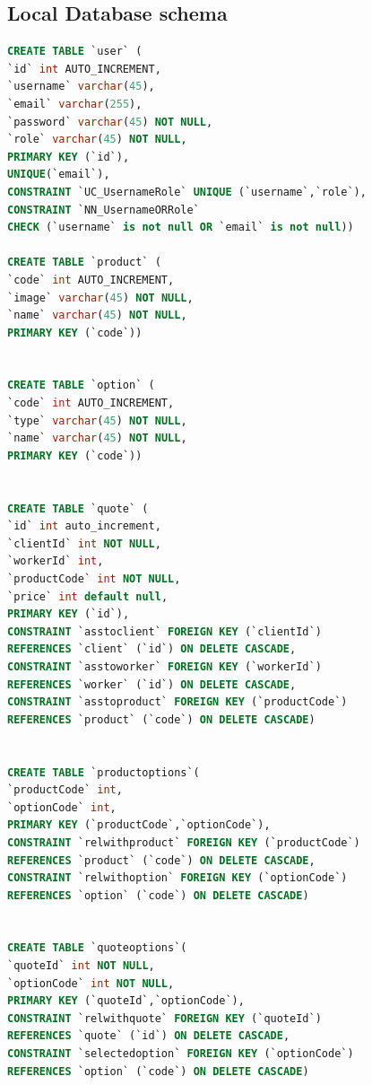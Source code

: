 \documentclass[a4paper, 12pt]{article}
\begin{document}
\subsection{Local Database schema}  \label{sub:localDatabaseSchema}
\begin{lstlisting}[language=SQL]
CREATE TABLE `user` (
`id` int AUTO_INCREMENT,
`username` varchar(45),
`email` varchar(255),
`password` varchar(45) NOT NULL,
`role` varchar(45) NOT NULL,
PRIMARY KEY (`id`),
UNIQUE(`email`),
CONSTRAINT `UC_UsernameRole` UNIQUE (`username`,`role`),
CONSTRAINT `NN_UsernameORRole` 
CHECK (`username` is not null OR `email` is not null))

CREATE TABLE `product` (
`code` int AUTO_INCREMENT,
`image` varchar(45) NOT NULL,
`name` varchar(45) NOT NULL,
PRIMARY KEY (`code`))


CREATE TABLE `option` (
`code` int AUTO_INCREMENT,
`type` varchar(45) NOT NULL,
`name` varchar(45) NOT NULL,
PRIMARY KEY (`code`))


CREATE TABLE `quote` (
`id` int auto_increment,
`clientId` int NOT NULL,
`workerId` int,
`productCode` int NOT NULL,
`price` int default null,
PRIMARY KEY (`id`),
CONSTRAINT `asstoclient` FOREIGN KEY (`clientId`) 
REFERENCES `client` (`id`) ON DELETE CASCADE,
CONSTRAINT `asstoworker` FOREIGN KEY (`workerId`) 
REFERENCES `worker` (`id`) ON DELETE CASCADE,
CONSTRAINT `asstoproduct` FOREIGN KEY (`productCode`) 
REFERENCES `product` (`code`) ON DELETE CASCADE)


CREATE TABLE `productoptions`(
`productCode` int,
`optionCode` int,
PRIMARY KEY (`productCode`,`optionCode`),
CONSTRAINT `relwithproduct` FOREIGN KEY (`productCode`) 
REFERENCES `product` (`code`) ON DELETE CASCADE,
CONSTRAINT `relwithoption` FOREIGN KEY (`optionCode`) 
REFERENCES `option` (`code`) ON DELETE CASCADE)


CREATE TABLE `quoteoptions`(
`quoteId` int NOT NULL,
`optionCode` int NOT NULL,
PRIMARY KEY (`quoteId`,`optionCode`),
CONSTRAINT `relwithquote` FOREIGN KEY (`quoteId`) 
REFERENCES `quote` (`id`) ON DELETE CASCADE,
CONSTRAINT `selectedoption` FOREIGN KEY (`optionCode`) 
REFERENCES `option` (`code`) ON DELETE CASCADE)
\end{lstlisting}
\end{document}
